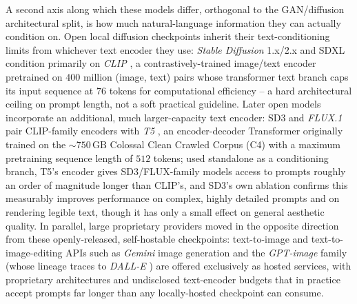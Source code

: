 A second axis along which these models differ, orthogonal to the GAN/diffusion architectural split, is how much natural-language information they can actually condition on. Open local diffusion checkpoints inherit their text-conditioning limits from whichever text encoder they use: \textit{Stable Diffusion} 1.x/2.x and SDXL condition primarily on \textit{CLIP} \cite{radfordLearningTransferableVisual2021}, a contrastively-trained image/text encoder pretrained on $400$ million (image, text) pairs whose transformer text branch caps its input sequence at $76$ tokens for computational efficiency -- a hard architectural ceiling on prompt length, not a soft practical guideline. Later open models incorporate an additional, much larger-capacity text encoder: SD3 and \textit{FLUX.1} \cite{labsBlackForestLabs} pair CLIP-family encoders with \textit{T5} \cite{raffelExploringLimitsTransfer2023}, an encoder-decoder Transformer originally trained on the $\sim 750\,\mathrm{GB}$ Colossal Clean Crawled Corpus (C4) with a maximum pretraining sequence length of $512$ tokens; used standalone as a conditioning branch, T5's encoder gives SD3/FLUX-family models access to prompts roughly an order of magnitude longer than CLIP's, and SD3's own ablation confirms this measurably improves performance on complex, highly detailed prompts and on rendering legible text, though it has only a small effect on general aesthetic quality. In parallel, large proprietary providers moved in the opposite direction from these openly-released, self-hostable checkpoints: text-to-image and text-to-image-editing APIs such as \textit{Gemini} image generation and the \textit{GPT-image} family (whose lineage traces to \textit{DALL-E} \cite{openaiDALLECreatingImages2021}) are offered exclusively as hosted services, with proprietary architectures and undisclosed text-encoder budgets that in practice accept prompts far longer than any locally-hosted checkpoint can consume.

